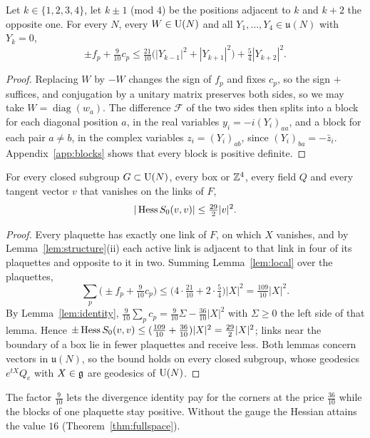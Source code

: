 \begin{lemma}\label{lem:local}
Let $k\in\{1,2,3,4\}$, let $k\pm1$ \textup{(}mod $4$\textup{)} be the
positions adjacent to $k$ and $k+2$ the opposite one. For every $N$, every
$W\in\mathrm{U}(N)$ and all $Y_1,\dots,Y_4\in\mathfrak u(N)$ with $Y_k=0$,
\[
\pm f_p+\tfrac9{10}c_p\le\tfrac{21}{10}\bigl(|Y_{k-1}|^2+|Y_{k+1}|^2\bigr)
+\tfrac54|Y_{k+2}|^2 .
\]
\end{lemma}

\begin{proof}
Replacing $W$ by $-W$ changes the sign of $f_p$ and fixes $c_p$, so the sign
$+$ suffices, and conjugation by a unitary matrix preserves both sides, so we
may take $W=\operatorname{diag}(w_a)$. The difference $\mathcal F$ of the two
sides then splits into a block for each diagonal position $a$, in the real
variables $y_i=-i(Y_i)_{aa}$, and a block for each pair $a\ne b$, in the
complex variables $z_i=(Y_i)_{ab}$, since $(Y_i)_{ba}=-\bar z_i$.
Appendix~\ref{app:blocks} shows that every block is positive definite.
\end{proof}

\begin{theorem}\label{thm:hess}
For every closed subgroup $G\subset\mathrm{U}(N)$, every box or $\mathbb{Z}^4$, every field
$Q$ and every tangent vector $v$ that vanishes on the links of $F$,
\[
|\operatorname{Hess} S_0(v,v)|\le\tfrac{29}2|v|^2 .
\]
\end{theorem}

\begin{proof}
Every plaquette has exactly one link of $F$, on which $X$ vanishes, and by
Lemma~\ref{lem:structure}(ii) each active link is adjacent to that link in
four of its plaquettes and opposite to it in two. Summing
Lemma~\ref{lem:local} over the plaquettes,
\[
\sum_p\bigl(\pm f_p+\tfrac9{10}c_p\bigr)\le\bigl(4\cdot\tfrac{21}{10}+2\cdot
\tfrac54\bigr)|X|^2=\tfrac{109}{10}|X|^2 .
\]
By Lemma~\ref{lem:identity}, $\frac9{10}\sum_pc_p=\frac9{10}\Sigma-\frac{36}{10}
|X|^2$ with $\Sigma\ge0$ the left side of that lemma. Hence $\pm\operatorname{Hess} S_0(v,v)
\le(\frac{109}{10}+\frac{36}{10})|X|^2=\frac{29}2|X|^2$; links near the boundary
of a box lie in fewer plaquettes and receive less. Both lemmas concern
vectors in $\mathfrak u(N)$, so the bound holds on every closed subgroup, whose
geodesics $e^{tX}Q_e$ with $X\in\mathfrak{g}$ are geodesics of $\mathrm{U}(N)$.
\end{proof}

The factor $\frac9{10}$ lets the divergence identity pay for the corners at
the price $\frac{36}{10}$ while the blocks of one plaquette stay positive.
Without the gauge the Hessian attains the value $16$ (Theorem~\ref{thm:fullspace}).

